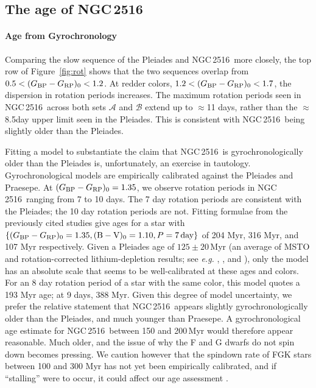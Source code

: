 \documentclass[12pt,twocolumn,tighten]{aastex63}
\newcommand{\cn}{NGC\,2516} %
\newcommand{\bpmrpo}{(G_{\rm BP}-G_{\rm RP})_0}
\begin{document}
\subsection{The age of NGC\,2516}
\label{disc:absage}


\paragraph{Age from Gyrochronology}
Comparing the slow sequence of the Pleiades and \cn\ more closely, the
top row of Figure~\ref{fig:rot} shows that the two sequences overlap
from $0.5<\bpmrpo<1.2$.  At redder colors, $1.2<\bpmrpo<1.7$, the
dispersion in rotation periods increases.  The maximum rotation
periods seen in \cn\ across both sets $\mathcal{A}$ and $\mathcal{B}$
extend up to $\approx$11 days, rather than the $\approx$8.5day upper
limit seen in the Pleiades.  This is consistent with \cn\ being
slightly older than the Pleiades.

Fitting a model to substantiate the claim that \cn\ is
gyrochronologically older than the Pleiades \citep[{\it e.g.}, any
of][]{mamajek_improved_2008,angus_toward_2019,spada_competing_2020}
is, unfortunately, an exercise in tautology.  Gyrochronological models
are empirically calibrated against the Pleiades and Praesepe.  At
$\bpmrpo=1.35$, we observe rotation periods in \cn\ ranging from 7 to
10 days.  The 7 day rotation periods are consistent with the Pleiades;
the 10 day rotation periods are not.  Fitting formulae from the
previously cited studies give ages for a star with $\{\bpmrpo=1.35,
(\mathrm{B}-\mathrm{V})_0=1.10, P=7\,{\rm day}\}$ of 204 Myr, 316 Myr,
and 107 Myr respectively.  Given a Pleiades age of $125\pm20$\,Myr (an
average of MSTO and rotation-corrected lithium-depletion results; see
{\it e.g.} \citealt{stauffer_keck_1998},
\citealt{soderblom_ages_2014}, and \citealt{cummings_2018}), only the
\citet{spada_competing_2020} model has an absolute scale that seems to
be well-calibrated at these ages and colors.  For an 8 day rotation
period of a star with the same color, this model quotes a 193 Myr age;
at 9 days, 388 Myr.  Given this degree of model uncertainty, we prefer
the relative statement that \cn\ appears slightly gyrochronologically
older than the Pleiades, and much younger than Praesepe.  A
gyrochronological age estimate for \cn\ between 150 and 200\,Myr would
therefore appear reasonable.  Much older, and the issue of why the F
and G dwarfs do not spin down becomes pressing.  We caution however
that the spindown rate of FGK stars between 100 and 300 Myr has not
yet been empirically calibrated, and if ``stalling'' were to occur, it
could affect our age assessment \citep[see][]{curtis_rup147_2020}.
\end{document}
